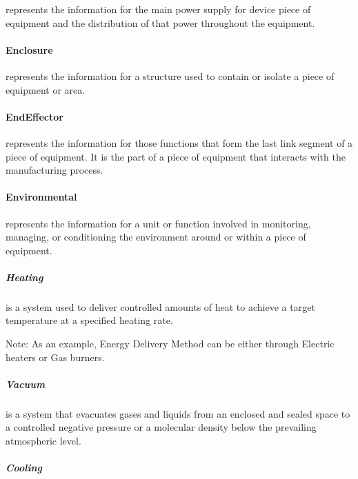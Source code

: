  represents the information for the main power supply for device piece of equipment and the distribution of that power throughout the equipment.



\paragraph{Enclosure}\mbox{}
\label{sec:Enclosure}


 represents the information for a structure used to contain or isolate a piece of equipment or area.



\paragraph{EndEffector}\mbox{}
\label{sec:EndEffector}


 represents the information for those functions that form the last link segment of a piece of equipment. It is the part of a piece of equipment that interacts with the manufacturing process.



\paragraph{Environmental}\mbox{}
\label{sec:Environmental}


 represents the information for a unit or function involved in monitoring, managing, or conditioning the environment around or within a piece of equipment.



\subparagraph{Heating}\mbox{}
\label{sec:Heating}


 is a system used to deliver controlled amounts of heat to achieve a target temperature at a specified heating rate.

Note: As an example, Energy Delivery Method can be either through Electric heaters or Gas burners.



\subparagraph{Vacuum}\mbox{}
\label{sec:Vacuum}


 is a system that evacuates gases and liquids from an enclosed and sealed space to a controlled negative pressure or a molecular density below the prevailing atmospheric level.



\subparagraph{Cooling}\mbox{}
\label{sec:Cooling}


